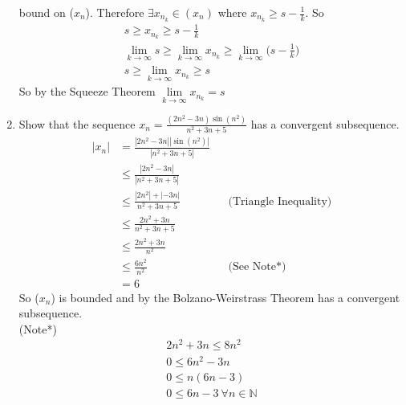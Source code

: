 \documentclass[12pt]{article}
\begin{document}
\begin{enumerate}
	bound on ($x_n$). Therefore $\exists x_{n_k} \in (x_n)$ where $x_{n_k} \geq s-\frac{1}{k}$. So 
	\begin{gather*}
		s \geq x_{n_k} \geq s-\frac{1}{k} \\
		\lim_{k \to \infty} s \geq \lim_{k \to \infty} x_{n_k} \geq \lim_{k \to \infty}\bigg(s-\frac{1}{k}\bigg) \\
		s \geq \lim_{k \rightarrow \infty} x_{n_k} \geq s
	\end{gather*}
	So by the Squeeze Theorem $\lim\limits_{k \to \infty} x_{n_k} = s$
	\item Show that the sequence $x_n = \frac{{(2n^2-3n)}\sin{(n^2)}}{n^2+3n+5}$ has a convergent subsequence.
		  \begin{align*}
			  |x_n| &= \frac{|2n^2-3n||\sin{(n^2)}|}{|n^2+3n+5|} \\
			  & \leq \frac{|2n^2-3n|}{|n^2+3n+5|} \\
			  & \leq \frac{|2n^2| + |-3n|}{n^2+3n+5} && \text{(Triangle Inequality)} \\
			  & \leq \frac{2n^2+3n}{n^2+3n+5} \\
			  & \leq \frac{2n^2+3n}{n^2} \\
			  & \leq \frac{6n^2}{n^2} && \text{(See Note*)} \\
			  &= 6
		  \end{align*}
		  So ($x_n$) is bounded and by the Bolzano-Weirstrass Theorem has a convergent subsequence. \\
		  (Note*)
		  \begin{gather*}
			  2n^2+3n \leq 8n^2 \\
			  0 \leq 6n^2-3n \\
			  0 \leq n(6n-3) \\
			  0 \leq 6n-3 \ \forall n \in \mathbb{N}
		  \end{gather*}
\end{enumerate}
\end{document}
